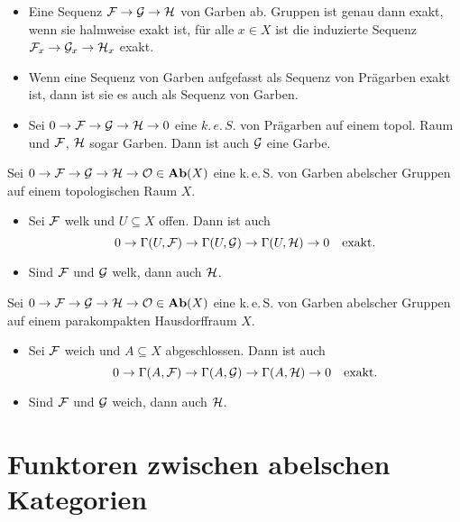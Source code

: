 \documentclass{cheat-sheet}
\newcommand{\keS}{k.\,e.\,S.} %
\begin{document}
\begin{lem}
  \begin{itemize}
    \item Eine Sequenz $\mathcal{F} \to \mathcal{G} \to \mathcal{H}$ von Garben ab. Gruppen ist genau dann exakt, wenn sie halmweise exakt ist, \dh{} für alle $x \in X$ ist die induzierte Sequenz $\mathcal{F}_x \to \mathcal{G}_x \to \mathcal{H}_x$ exakt.
    \item Wenn eine Sequenz von Garben aufgefasst als Sequenz von Prägarben exakt ist, dann ist sie es auch als Sequenz von Garben.
    \item Sei $0 \to \mathcal{F} \to \mathcal{G} \to \mathcal{H} \to 0$ eine $\keS{}$ von Prägarben auf einem topol. Raum und $\mathcal{F}$, $\mathcal{H}$ sogar Garben. Dann ist auch $\mathcal{G}$ eine Garbe.
  \end{itemize}
\end{lem}

\begin{lem}
  Sei $0 \to \mathcal{F} \to \mathcal{G} \to \mathcal{H} \to \mathcal{O} \in \mathbf{Ab}(X)$ eine \keS{} von Garben abelscher Gruppen auf einem topologischen Raum $X$.
  \begin{itemize}
    \item Sei $\mathcal{F}$ welk und $U \subseteq X$ offen. Dann ist auch
    \[
      0 \to \Gamma(U, \mathcal{F}) \to \Gamma(U, \mathcal{G}) \to \Gamma(U, \mathcal{H}) \to 0
      \quad \text{exakt.}
    \]
    \item Sind $\mathcal{F}$ und $\mathcal{G}$ welk, dann auch $\mathcal{H}$.
  \end{itemize}
\end{lem}

\begin{lem}
  Sei $0 \to \mathcal{F} \to \mathcal{G} \to \mathcal{H} \to \mathcal{O} \in \mathbf{Ab}(X)$ eine \keS{} von Garben abelscher Gruppen auf einem parakompakten Hausdorffraum $X$.
  \begin{itemize}
    \item Sei $\mathcal{F}$ weich und $A \subseteq X$ abgeschlossen. Dann ist auch
    \[
      0 \to \Gamma(A, \mathcal{F}) \to \Gamma(A, \mathcal{G}) \to \Gamma(A, \mathcal{H}) \to 0
      \quad \text{exakt.}
    \]
    \item Sind $\mathcal{F}$ und $\mathcal{G}$ weich, dann auch $\mathcal{H}$.
  \end{itemize}
\end{lem}

\section{Funktoren zwischen abelschen Kategorien}
\end{document}
